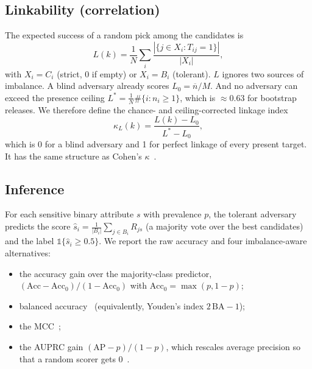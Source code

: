 \documentclass[preprint,12pt]{elsarticle}
\newcommand{\kL}{\kappa_{L}}
\begin{document}
\subsection{Linkability (correlation)}
The expected success of a random pick among the candidates is
\[L(k)=\frac1N\sum_i \frac{|\{j\in X_i: T_{ij}=1\}|}{|X_i|},\]
with $X_i=C_i$ (strict, $0$ if empty) or $X_i=B_i$ (tolerant). $L$ ignores two sources of imbalance. A blind adversary already scores $L_0=\overline{n}/M$. And no adversary can exceed the presence ceiling $L^\ast=\frac1N\#\{i:n_i\ge1\}$, which is $\approx 0.63$ for bootstrap releases. We therefore define the chance- and ceiling-corrected linkage index
\begin{equation}
\kL(k)=\frac{L(k)-L_0}{L^\ast-L_0},
\label{eq:kappaL}
\end{equation}
which is 0 for a blind adversary and 1 for perfect linkage of every present target. It has the same structure as Cohen's $\kappa$~\cite{cohen1960kappa}.

\subsection{Inference}
For each sensitive binary attribute $s$ with prevalence $p$, the tolerant adversary predicts the score $\hat s_i=\frac{1}{|B_i|}\sum_{j\in B_i} R_{js}$ (a majority vote over the best candidates) and the label $\mathbb{1}\{\hat s_i\ge 0.5\}$. We report the raw accuracy and four imbalance-aware alternatives:
\begin{itemize}
\item the accuracy gain over the majority-class predictor, $(\mathrm{Acc}-\mathrm{Acc}_0)/(1-\mathrm{Acc}_0)$ with $\mathrm{Acc}_0=\max(p,1-p)$;
\item balanced accuracy~\cite{brodersen2010balanced} (equivalently, Youden's index $2\,\mathrm{BA}-1$);
\item the MCC~\cite{matthews1975,chicco2020mcc};
\item the AUPRC gain $(\mathrm{AP}-p)/(1-p)$, which rescales average precision so that a random scorer gets 0~\cite{saito2015prc}.
\end{itemize}
\end{document}
